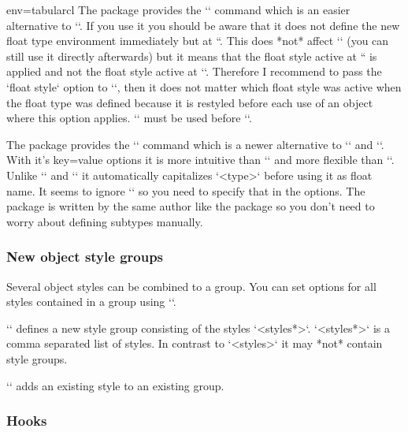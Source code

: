 \begin{tableobject}{env=tabular}{cl}
\DescribeMacro{\trivfloat}
The  package provides the `` command which is an easier alternative to `\newfloat`.
If you use it you should be aware that it does not define the new float type environment immediately but at ``.
This does *not* affect `\NewObjectStyle` (you can still use it directly afterwards)
but it means that the float style active at `` is applied and not the float style active at `\trivfloat`.
Therefore I recommend to pass the `float style` option to `\NewObjectStyle`,
then it does not matter which float style was active when the float type was defined because it is restyled before each use of an object where this option applies.
`\trivfloat` must be used before ``.

\DescribeMacro{\DeclareFloatingEnvironment}
The  package provides the `` command which is a newer alternative to `\newfloat` and `\trivfloat`.
With it's key=value options it is more intuitive than `\newfloat` and more flexible than `\trivfloat`.
Unlike `\newfloat` and `\trivfloat` it automatically capitalizes `<type>` before using it as float name.
It seems to ignore `\floatstyle` so you need to specify that in the options.
The  package is written by the same author like the  package so you don't need to worry about defining subtypes manually.


\subsubsection{New object style groups}
\label{new-object-style-groups}

Several object styles can be combined to a group.
You can set options for all styles contained in a group using ``.

\DescribeMacro{\NewObjectStyleGroup}
``
defines a new style group consisting of the styles `<styles*>`.
`<styles*>` is a comma separated list of styles.
In contrast to `<styles>` it may *not* contain style groups.

\DescribeMacro{\AddObjectStyleToGroup}
``
adds an existing style to an existing group.


\subsubsection{Hooks}
\label{hooks}


\end{tableobject}
